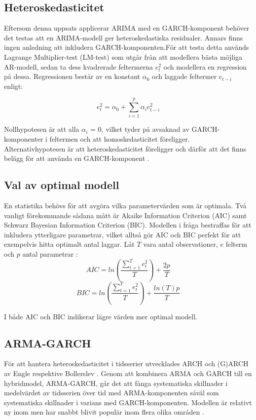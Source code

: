 \documentclass[11pt]{article}
\numberwithin{equation}{section}
\numberwithin{table}{section}
\numberwithin{figure}{section}
\begin{document}
\subsection{Heteroskedasticitet}

Eftersom denna uppsats applicerar ARIMA med en GARCH-komponent behöver det testas att en ARIMA-modell ger heteroskedastiska residualer. Annars finns ingen anledning att inkludera GARCH-komponenten.För att testa detta används Lagrange Multiplier-test (LM-test) som utgår från att modellera bästa möjliga AR-modell, sedan ta dess kvadrerade feltermerna \(e_t^2\) och modellera en regression på dessa. Regressionen består av en konstant \(\alpha_0\) och laggade feltermer \(e_{t-i}\) enligt:

\begin{equation}
    e_t^2=\alpha_0+\sum_{i=1}^{p}\alpha_ie_{t-i}^2
\end{equation}

Nollhypotesen är att alla \(\alpha_i\) = 0, vilket tyder på avsaknad av GARCH-komponenter i feltermen och att homoskedasticitet föreligger. Alternativhypotesen är att heteroskedasticitet föreligger och därför att det finns belägg för att använda en GARCH-komponent \parencite{engle1982autoregressive}. 

\subsection{Val av optimal modell}
En statistika behövs för att avgöra vilka parametervärden som är optimala. Två vanligt förekommande sådana mått är Akaike Information Criterion (AIC) samt Schwarz Bayesian Information Criterion (BIC). Modellen i fråga bestraffas för att inkludera ytterligare parametrar, vilket alltså gör AIC och BIC perfekt för att exempelvis hitta optimalt antal laggar. Låt $T$ vara antal observationer, $e$ felterm och $p$ antal parametrar \parencite[][s.76 f.]{montgomery2015forecasting}:
\begin{equation}
    AIC = ln\left( \frac{\sum_{t=1}^{T}e^2_t}{T} \right)+\frac{2p}{T}
\end{equation}
\begin{equation}
    BIC = ln\left( \frac{\sum_{t=1}^{T}e^2_t}{T} \right)+\frac{ln(T)p}{T}
\end{equation}

I både AIC och BIC indikerar lägre värden mer optimal modell. 

\subsection{ARMA-GARCH}
För att hantera heteroskedasticitet i tidsserier utvecklades ARCH och (G)ARCH av Engle \parencite*{engle1982autoregressive} respektive Bollerslev \parencite*{bollerslev1986generalized}. Genom att kombinera ARMA och GARCH till en hybridmodel, ARMA-GARCH, går det att fånga systematiska skillnader i medelvärdet av tidsserien över tid med ARMA-komponenten såväl som systematiska skillnader i varians med GARCH-komponenten. Modellen är relativt ny inom men har snabbt blivit populär inom flera olika områden \parencite{chen2011short}. 
\end{document}
